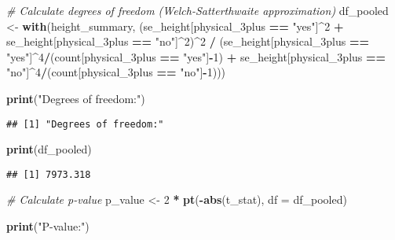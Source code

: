 \documentclass[
]{article}
\newenvironment{Shaded}{\begin{snugshade}}{\end{snugshade}}
\newcommand{\AttributeTok}[1]{\textcolor[rgb]{0.13,0.29,0.53}{#1}}
\newcommand{\CommentTok}[1]{\textcolor[rgb]{0.56,0.35,0.01}{\textit{#1}}}
\newcommand{\DecValTok}[1]{\textcolor[rgb]{0.00,0.00,0.81}{#1}}
\newcommand{\FunctionTok}[1]{\textcolor[rgb]{0.13,0.29,0.53}{\textbf{#1}}}
\newcommand{\NormalTok}[1]{#1}
\newcommand{\OtherTok}[1]{\textcolor[rgb]{0.56,0.35,0.01}{#1}}
\newcommand{\SpecialCharTok}[1]{\textcolor[rgb]{0.81,0.36,0.00}{\textbf{#1}}}
\newcommand{\StringTok}[1]{\textcolor[rgb]{0.31,0.60,0.02}{#1}}
\begin{document}
\begin{Shaded}
\begin{Highlighting}[]
\CommentTok{\# Calculate degrees of freedom (Welch{-}Satterthwaite approximation)}
\NormalTok{df\_pooled }\OtherTok{\textless{}{-}} \FunctionTok{with}\NormalTok{(height\_summary,}
\NormalTok{                 (se\_height[physical\_3plus }\SpecialCharTok{==} \StringTok{"yes"}\NormalTok{]}\SpecialCharTok{\^{}}\DecValTok{2} \SpecialCharTok{+}\NormalTok{ se\_height[physical\_3plus }\SpecialCharTok{==} \StringTok{"no"}\NormalTok{]}\SpecialCharTok{\^{}}\DecValTok{2}\NormalTok{)}\SpecialCharTok{\^{}}\DecValTok{2} \SpecialCharTok{/}
\NormalTok{                 (se\_height[physical\_3plus }\SpecialCharTok{==} \StringTok{"yes"}\NormalTok{]}\SpecialCharTok{\^{}}\DecValTok{4}\SpecialCharTok{/}\NormalTok{(count[physical\_3plus }\SpecialCharTok{==} \StringTok{"yes"}\NormalTok{]}\SpecialCharTok{{-}}\DecValTok{1}\NormalTok{) }\SpecialCharTok{+} 
\NormalTok{                  se\_height[physical\_3plus }\SpecialCharTok{==} \StringTok{"no"}\NormalTok{]}\SpecialCharTok{\^{}}\DecValTok{4}\SpecialCharTok{/}\NormalTok{(count[physical\_3plus }\SpecialCharTok{==} \StringTok{"no"}\NormalTok{]}\SpecialCharTok{{-}}\DecValTok{1}\NormalTok{)))}

\FunctionTok{print}\NormalTok{(}\StringTok{"Degrees of freedom:"}\NormalTok{)}
\end{Highlighting}
\end{Shaded}

\begin{verbatim}
## [1] "Degrees of freedom:"
\end{verbatim}

\begin{Shaded}
\begin{Highlighting}[]
\FunctionTok{print}\NormalTok{(df\_pooled)}
\end{Highlighting}
\end{Shaded}

\begin{verbatim}
## [1] 7973.318
\end{verbatim}

\begin{Shaded}
\begin{Highlighting}[]
\CommentTok{\# Calculate p{-}value}
\NormalTok{p\_value }\OtherTok{\textless{}{-}} \DecValTok{2} \SpecialCharTok{*} \FunctionTok{pt}\NormalTok{(}\SpecialCharTok{{-}}\FunctionTok{abs}\NormalTok{(t\_stat), }\AttributeTok{df =}\NormalTok{ df\_pooled)}

\FunctionTok{print}\NormalTok{(}\StringTok{"P{-}value:"}\NormalTok{)}
\end{Highlighting}
\end{Shaded}
\end{document}
